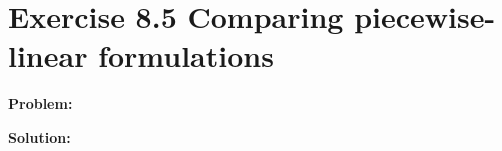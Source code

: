 \section{Exercise 8.5 Comparing piecewise-linear formulations}
\textbf{Problem:} 

\textbf{Solution:} 